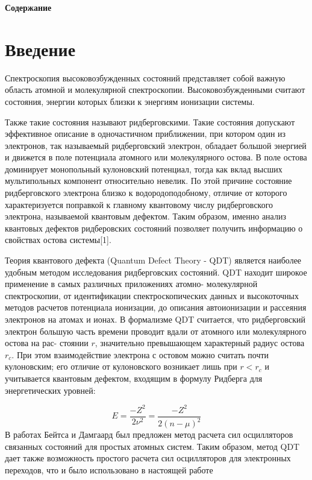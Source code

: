 \documentclass[a4paper]{article}
\title{}
\author{}
\date{2016-07-10}
\begin{document}
\clearpage\setcounter{page}{1}\pagestyle{Standard}


\textbf{Содержание}

\setcounter{tocdepth}{4}
\renewcommand\contentsname{}
\tableofcontents

\bigskip


\bigskip


\bigskip

\clearpage\section{Введение}
\hypertarget{RefHeading4667463868395}{}\hypertarget{Toc453749978}{}Спектроскопия
высоковозбужденных состояний представляет собой важную область атомной и молекулярной спектроскопии. Высоковозбужденными считают состояния, энергии которых близки к энергиям ионизации системы.

Также такие состояния называют ридберговскими. Такие состоя\-ния допускают эффективное описание в одночастичном приближении, при ко\-тором один из электронов, так называемый ридберговский электрон, обладает большой энергией и движется в поле потенциала атомного или молекулярного остова. В поле остова доминирует монопольный кулоновский потенциал, тогда как вклад высших мультипольных компонент относительно невелик. По этой причине состояние ридберговского электрона близко к водородоподобному, отличие от которого характеризуется поправкой к главному квантовому числу ридберговского электрона, называемой квантовым дефектом. Таким образом, именно анализ квантовых дефектов ридберовских состояний позволяет получить информацию о свойствах остова системы[1]. 

Теория квантового дефекта (Quantum Defect Theory - QDT) является наиболее удобным методом исследования ридберговских состояний. QDT находит широкое применение в самых различных приложениях атомно- молекулярной спектроскопии, от идентификации спектроскопических данных и высокоточных методов расчетов потенциала ионизации, до описания автоионизации и рассеяния электронов на атомах и ионах. В формализме QDT считается, что ридберговский электрон большую часть времени проводит вдали от атомного или молекулярного остова на рас-
стоянии  $r$,
значительно превышающем характерный
радиус остова  $r_c$. При
этом взаимодействие электрона с остовом можно считать почти кулоновским; его отличие от кулоновского возникает лишь при
 $r<r_c$ и учитывается
квантовым дефектом, входящим в формулу Ридберга для энергетических уровней:

\begin{equation*}
E=\frac{-Z^2}{2\nu ^2}=\frac{-Z^2}{2(n-\mu )^2}
\end{equation*}
В работах Бейтса и Дамгаард был предложен метод расчета сил осцилляторов связанных состояний для простых атомных систем. Таким образом, метод QDT дает также возможность простого расчета сил осцилляторов для электронных переходов, что и было использовано в настоящей работе
\end{document}
